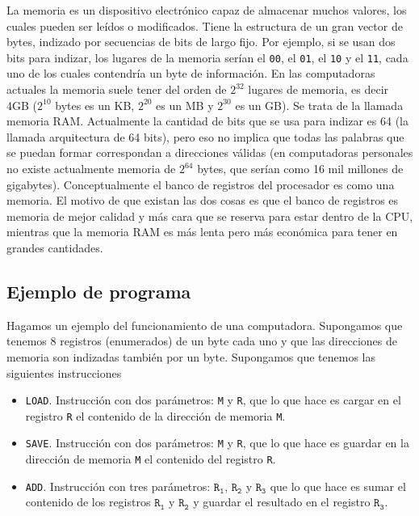 \documentclass[a4paper, 12pt]{report}
\theoremstyle{definition}
\begin{document}
La memoria es un dispositivo electrónico capaz de almacenar muchos valores, los cuales pueden ser leídos o modificados. Tiene la estructura de un gran vector de bytes, indizado por secuencias de bits de largo fijo. Por ejemplo, si se usan dos bits para indizar, los lugares de la memoria serían el {\tt 00}, el {\tt 01}, el {\tt 10} y el {\tt 11}, cada uno de los cuales contendría un byte de información. En las computadoras actuales la memoria suele tener del orden de $2^{32}$ lugares de memoria, es decir 4GB ($2^{10}$ bytes es un KB, $2^{20}$ es un MB y $2^{30}$ es un GB). Se trata de la llamada memoria RAM. Actualmente la cantidad de bits que se usa para indizar es 64 (la llamada arquitectura de 64 bits), pero eso no implica que todas las palabras que se puedan formar correspondan a direcciones válidas (en computadoras personales no existe actualmente memoria de $2^{64}$ bytes, que serían como 16 mil millones de gigabytes). Conceptualmente el banco de registros del procesador es como una memoria. El motivo de que existan las dos cosas es que el banco de registros es memoria de mejor calidad y más cara que se reserva para estar dentro de la CPU, mientras que la memoria RAM es más lenta pero más económica para tener en grandes cantidades.

\subsection{Ejemplo de programa}

Hagamos un ejemplo del funcionamiento de una computadora. Supongamos que tenemos 8 registros (enumerados) de un byte cada uno y que las direcciones de memoria son indizadas también por un byte. Supongamos que tenemos las siguientes instrucciones
\begin{itemize}
	\item {\tt LOAD}. Instrucción con dos parámetros: {\tt M} y {\tt R}, que lo que hace es cargar en el registro {\tt R} el contenido de la dirección de memoria {\tt M}.
	\item {\tt SAVE}. Instrucción con dos parámetros: {\tt M} y {\tt R}, que lo que hace es guardar en la dirección de memoria {\tt M} el contenido del registro {\tt R}.
	\item {\tt ADD}. Instrucción con tres parámetros: $\mathtt{R_1}$, $\mathtt{R_2}$ y $\mathtt{R_3}$ que lo que hace es sumar el contenido de los registros $\mathtt{R_1}$ y $\mathtt{R_2}$ y guardar el resultado en el registro $\mathtt{R_3}$.
\end{itemize}
\end{document}

